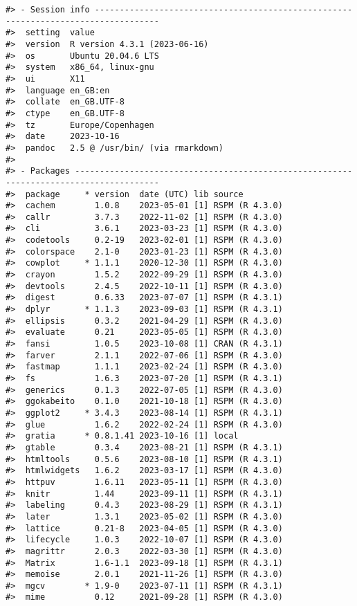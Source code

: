 \documentclass[12pt,]{article}
\begin{document}
\begin{verbatim}
#> - Session info -----------------------------------------------------------------------------------
#>  setting  value
#>  version  R version 4.3.1 (2023-06-16)
#>  os       Ubuntu 20.04.6 LTS
#>  system   x86_64, linux-gnu
#>  ui       X11
#>  language en_GB:en
#>  collate  en_GB.UTF-8
#>  ctype    en_GB.UTF-8
#>  tz       Europe/Copenhagen
#>  date     2023-10-16
#>  pandoc   2.5 @ /usr/bin/ (via rmarkdown)
#> 
#> - Packages ---------------------------------------------------------------------------------------
#>  package     * version  date (UTC) lib source
#>  cachem        1.0.8    2023-05-01 [1] RSPM (R 4.3.0)
#>  callr         3.7.3    2022-11-02 [1] RSPM (R 4.3.0)
#>  cli           3.6.1    2023-03-23 [1] RSPM (R 4.3.0)
#>  codetools     0.2-19   2023-02-01 [1] RSPM (R 4.3.0)
#>  colorspace    2.1-0    2023-01-23 [1] RSPM (R 4.3.0)
#>  cowplot     * 1.1.1    2020-12-30 [1] RSPM (R 4.3.0)
#>  crayon        1.5.2    2022-09-29 [1] RSPM (R 4.3.0)
#>  devtools      2.4.5    2022-10-11 [1] RSPM (R 4.3.0)
#>  digest        0.6.33   2023-07-07 [1] RSPM (R 4.3.1)
#>  dplyr       * 1.1.3    2023-09-03 [1] RSPM (R 4.3.1)
#>  ellipsis      0.3.2    2021-04-29 [1] RSPM (R 4.3.0)
#>  evaluate      0.21     2023-05-05 [1] RSPM (R 4.3.0)
#>  fansi         1.0.5    2023-10-08 [1] CRAN (R 4.3.1)
#>  farver        2.1.1    2022-07-06 [1] RSPM (R 4.3.0)
#>  fastmap       1.1.1    2023-02-24 [1] RSPM (R 4.3.0)
#>  fs            1.6.3    2023-07-20 [1] RSPM (R 4.3.1)
#>  generics      0.1.3    2022-07-05 [1] RSPM (R 4.3.0)
#>  ggokabeito    0.1.0    2021-10-18 [1] RSPM (R 4.3.0)
#>  ggplot2     * 3.4.3    2023-08-14 [1] RSPM (R 4.3.1)
#>  glue          1.6.2    2022-02-24 [1] RSPM (R 4.3.0)
#>  gratia      * 0.8.1.41 2023-10-16 [1] local
#>  gtable        0.3.4    2023-08-21 [1] RSPM (R 4.3.1)
#>  htmltools     0.5.6    2023-08-10 [1] RSPM (R 4.3.1)
#>  htmlwidgets   1.6.2    2023-03-17 [1] RSPM (R 4.3.0)
#>  httpuv        1.6.11   2023-05-11 [1] RSPM (R 4.3.0)
#>  knitr         1.44     2023-09-11 [1] RSPM (R 4.3.1)
#>  labeling      0.4.3    2023-08-29 [1] RSPM (R 4.3.1)
#>  later         1.3.1    2023-05-02 [1] RSPM (R 4.3.0)
#>  lattice       0.21-8   2023-04-05 [1] RSPM (R 4.3.0)
#>  lifecycle     1.0.3    2022-10-07 [1] RSPM (R 4.3.0)
#>  magrittr      2.0.3    2022-03-30 [1] RSPM (R 4.3.0)
#>  Matrix        1.6-1.1  2023-09-18 [1] RSPM (R 4.3.1)
#>  memoise       2.0.1    2021-11-26 [1] RSPM (R 4.3.0)
#>  mgcv        * 1.9-0    2023-07-11 [1] RSPM (R 4.3.1)
#>  mime          0.12     2021-09-28 [1] RSPM (R 4.3.0)

\end{verbatim}
\end{document}
